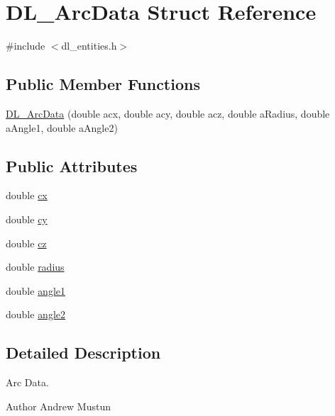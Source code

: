 \hypertarget{structDL__ArcData}{\section{D\-L\-\_\-\-Arc\-Data Struct Reference}
\label{structDL__ArcData}
}


{\ttfamily \#include $<$dl\-\_\-entities.\-h$>$}

\subsection*{Public Member Functions}
\begin{DoxyCompactItemize}
\item 
\hyperlink{structDL__ArcData_a9933b20b112915d67d50700366fc5af1}{D\-L\-\_\-\-Arc\-Data} (double acx, double acy, double acz, double a\-Radius, double a\-Angle1, double a\-Angle2)
\end{DoxyCompactItemize}
\subsection*{Public Attributes}
\begin{DoxyCompactItemize}
\item 
double \hyperlink{structDL__ArcData_af6d5aeee348cd30ac9492168088eae6e}{cx}
\item 
double \hyperlink{structDL__ArcData_aba4fee3500acf9c80abafe9fbe99edef}{cy}
\item 
double \hyperlink{structDL__ArcData_a178adce6d3782642a588ee9eb2e78208}{cz}
\item 
double \hyperlink{structDL__ArcData_aaf24d5d27c478fcb956781d758d34b31}{radius}
\item 
double \hyperlink{structDL__ArcData_ad542e9871ce311f06df735650c8728f2}{angle1}
\item 
double \hyperlink{structDL__ArcData_a9dd7ac722a92a317aea59d5384fbf94b}{angle2}
\end{DoxyCompactItemize}


\subsection{Detailed Description}
Arc Data.

\begin{DoxyAuthor}{Author}
Andrew Mustun 
\end{DoxyAuthor}


